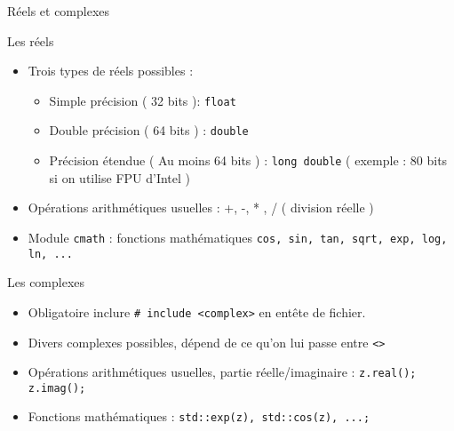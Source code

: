 \documentclass[handout,10pt]{beamer}
\newcommand{\includepartcode}[4][cpp]{

}
\begin{document}
\begin{frame}[fragile]{Réels et complexes}
\tiny
\begin{block}{Les réels}
\begin{itemize}
\item Trois types de réels possibles :
\begin{itemize}
\item Simple précision ( 32 bits ): \lstinline$float$
\item Double précision ( 64 bits )  : \lstinline$double$
\item Précision étendue ( Au moins 64 bits ) : \lstinline$long double$ ( exemple : 80 bits si on utilise FPU d'Intel )
\end{itemize}
\item Opérations arithmétiques usuelles : +, -, * , / ( division réelle )
\item Module \lstinline$cmath$ : fonctions mathématiques \lstinline$cos, sin, tan, sqrt, exp, log, ln, ...$
\end{itemize}
\includepartcode{declarations.cpp}{46}{50}
\end{block}

\begin{block}{Les complexes}
\begin{itemize}
\item Obligatoire inclure \lstinline$# include <complex>$ en entête de fichier.
\item Divers complexes possibles, dépend de ce qu'on lui passe entre \lstinline$<>$
\item Opérations arithmétiques usuelles, partie réelle/imaginaire : \lstinline$z.real(); z.imag();$
\item Fonctions mathématiques : \lstinline$std::exp(z), std::cos(z), ...;$
\includepartcode{declarations.cpp}{51}{54}
\end{itemize}
\end{block}
\end{frame}
\end{document}
